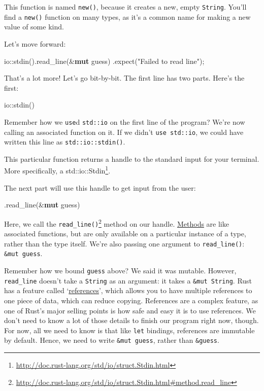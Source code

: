\documentclass[a4paper,]{book}
\newenvironment{Shaded}{\begin{snugshade}}{\end{snugshade}}
\newcommand{\KeywordTok}[1]{\textcolor[rgb]{0.13,0.29,0.53}{\textbf{{#1}}}}
\newcommand{\StringTok}[1]{\textcolor[rgb]{0.31,0.60,0.02}{{#1}}}
\newcommand{\NormalTok}[1]{{#1}}
\renewcommand{\href}[2]{#2\footnote{\url{#1}}}
\begin{document}
This function is named \texttt{new()}, because it creates a new, empty
\texttt{String}. You'll find a \texttt{new()} function on many types, as
it's a common name for making a new value of some kind.

Let's move forward:

\begin{Shaded}
\begin{Highlighting}[]
    \NormalTok{io::stdin().read_line(&}\KeywordTok{mut} \NormalTok{guess)}
        \NormalTok{.expect(}\StringTok{"Failed to read line"}\NormalTok{);}
\end{Highlighting}
\end{Shaded}

That's a lot more! Let's go bit-by-bit. The first line has two parts.
Here's the first:

\begin{Shaded}
\begin{Highlighting}[]
\NormalTok{io::stdin()}
\end{Highlighting}
\end{Shaded}

Remember how we \texttt{use}d \texttt{std::io} on the first line of the
program? We're now calling an associated function on it. If we didn't
\texttt{use\ std::io}, we could have written this line as
\texttt{std::io::stdin()}.

This particular function returns a handle to the standard input for your
terminal. More specifically, a
\href{http://doc.rust-lang.org/std/io/struct.Stdin.html}{std::io::Stdin}.

The next part will use this handle to get input from the user:

\begin{Shaded}
\begin{Highlighting}[]
\NormalTok{.read_line(&}\KeywordTok{mut} \NormalTok{guess)}
\end{Highlighting}
\end{Shaded}

Here, we call the
\href{http://doc.rust-lang.org/std/io/struct.Stdin.html\#method.read_line}{\texttt{read\_line()}}
method on our handle. \protect\hyperlink{sec--method-syntax}{Methods}
are like associated functions, but are only available on a particular
instance of a type, rather than the type itself. We're also passing one
argument to \texttt{read\_line()}: \texttt{\&mut\ guess}.

Remember how we bound \texttt{guess} above? We said it was mutable.
However, \texttt{read\_line} doesn't take a \texttt{String} as an
argument: it takes a \texttt{\&mut\ String}. Rust has a feature called
`\protect\hyperlink{sec--references-and-borrowing}{references}', which
allows you to have multiple references to one piece of data, which can
reduce copying. References are a complex feature, as one of Rust's major
selling points is how safe and easy it is to use references. We don't
need to know a lot of those details to finish our program right now,
though. For now, all we need to know is that like \texttt{let} bindings,
references are immutable by default. Hence, we need to write
\texttt{\&mut\ guess}, rather than \texttt{\&guess}.
\end{document}
